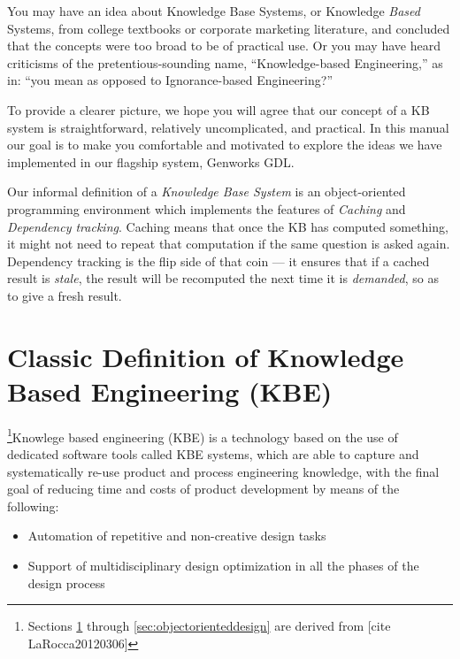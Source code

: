 \documentclass [11pt]{book}
\begin{document}
\label{sec:knowledgebaseconceptsaccordingtogenworks}

You may have an idea about Knowledge Base Systems,
or Knowledge \emph{Based} Systems, from college textbooks or corporate marketing
literature, and concluded that the concepts were too broad to be of
practical use. Or you may have heard criticisms of the
pretentious-sounding name, ``Knowledge-based Engineering,'' as in:
``you mean as opposed to Ignorance-based Engineering?'' 

To provide a clearer picture, we hope you will agree that our concept
of a KB system is straightforward, relatively uncomplicated, and
practical. In this manual  our goal is to make you comfortable
and motivated to explore the ideas we have implemented in our flagship
system, Genworks GDL.

Our informal definition of a \emph{Knowledge Base System} is an object-oriented programming environment which implements the features of \emph{Caching} and \emph{Dependency tracking}. Caching means that once the KB has computed something, it might not need to repeat 
that computation if the same question is asked again. Dependency tracking is the flip side
of that coin --- it ensures that if a cached result is \emph{stale}, the result will be recomputed the next time it is \emph{demanded}, so as to give a fresh result.

\section{Classic Definition of Knowledge Based Engineering (KBE)}

\label{sec:classicdefinitionofknowledgebasedengineering(kbe)}

\footnote{Sections 
\ref{sec:classicdefinitionofknowledgebasedengineering(kbe)} through 
\ref{sec:objectorienteddesign} are derived from [cite LaRocca20120306]}Knowlege based engineering (KBE) is a technology based on the
use of dedicated software tools called KBE systems, which are able to
capture and systematically re-use product and process engineering
knowledge, with the final goal of reducing time and costs of product
development by means of the following:

\begin{itemize}

\item Automation of repetitive and non-creative design tasks

\item Support of multidisciplinary design optimization in all the 
phases of the design process

\end{itemize}
\end{document}
